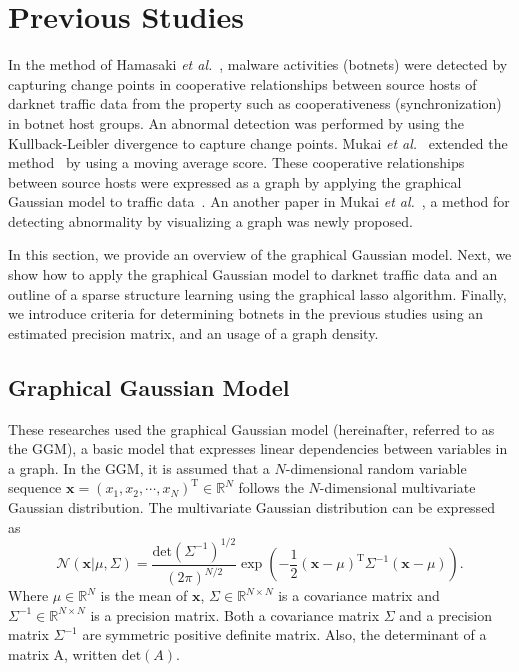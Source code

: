 \documentclass{sig-alternate-10pt}
\begin{document}
\section{Previous Studies}
In the method of Hamasaki {\it et al.}~\cite{Hamasaki}, malware activities (botnets) were detected by capturing change points in cooperative relationships between source hosts of darknet traffic data from the property such as cooperativeness (synchronization) in botnet host groups.
An abnormal detection was performed by using the Kullback-Leibler divergence to capture change points.
Mukai {\it et al.}~\cite{Mukai1} extended the method~\cite{Hamasaki} by using a moving average score.
These cooperative relationships between source hosts were expressed as a graph by applying the graphical Gaussian model to traffic data~\cite{Ide}.
An another paper in Mukai {\it et al.}~\cite{Mukai2}, a method for detecting abnormality by visualizing a graph was newly proposed.

In this section, we provide an overview of the graphical Gaussian model.
Next, we show how to apply the graphical Gaussian model to darknet traffic data and an outline of a sparse structure learning using the graphical lasso algorithm.
Finally, we introduce criteria for determining botnets in the previous studies using an estimated precision matrix, and an usage of a graph density.

\subsection{Graphical Gaussian Model}
These researches used the graphical Gaussian model (hereinafter, referred to as the GGM), a basic model that expresses linear dependencies between variables in a graph.
In the GGM, it is assumed that a $N$-dimensional random variable sequence $\bm{x}=(x_{1},x_{2},\cdots,x_{N})^\mathrm{T}\in\mathbb{R}^N$ follows the $N$-dimensional multivariate Gaussian distribution.
The multivariate Gaussian distribution can be expressed as
\begin{equation*}
\mathcal{N}({\bm{x}}|\mu,\Sigma)=\frac{\mathrm{det} (\Sigma^{-1})^{1/2}}{(2\pi)^{N/2}}\exp\left(-\frac{1}{2}(\bm{x}-\mu)^\mathrm{T}{\Sigma^{-1}}(\bm{x}-\mu)\right).
\end{equation*}
Where $\mu\in\mathbb{R}^N$ is the mean of $\bm{x}$, $\Sigma\in\mathbb{R}^{N \times N}$ is a covariance matrix and $\Sigma^{-1}\in\mathbb{R}^{N \times N}$ is a precision matrix.
Both a covariance matrix $\Sigma$ and a precision matrix $\Sigma^{-1}$ are symmetric positive definite matrix.
Also, the determinant of a matrix A, written $\mathrm{det}(A)$.
\end{document}
